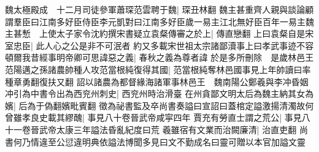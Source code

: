 魏太極殿成　十二月司徒參軍蕭琛范雲聘于魏|{
	琛丑林翻}
魏主甚重齊人親與談論顧謂羣臣曰江南多好臣侍臣李元凱對曰江南多好臣歲一易主江北無好臣百年一易主魏主甚慙　上使太子家令沈約撰宋書疑立袁粲傳審之於上|{
	傳直戀翻}
上曰袁粲自是宋室忠臣|{
	此人心之公是非不可泯者}
約又多載宋世祖太宗諸鄙瀆事上曰孝武事迹不容頓爾我昔經事明帝卿可思諱惡之義|{
	春秋之義為尊者諱}
於是多所刪除　是歲林邑王范陽邁之孫諸農帥種人攻范當根純復得其國|{
	范當根純奪林邑國事見上年帥讀曰率種章勇翻復扶又翻}
詔以諸農為都督緣海諸軍事林邑王　魏南陽公鄭羲與李冲昏姻冲引為中書令出為西兖州刺史|{
	西兖州時治滑臺}
在州貪鄙文明太后為魏主納其女為嬪|{
	后為于偽翻嬪毗賓翻}
徵為祕書監及卒尚書奏謚曰宣詔曰蓋棺定謚激揚清濁故何曾雖孝良史載其繆醜|{
	事見八十卷晉武帝咸寜四年}
賈充有勞直士謂之荒公|{
	事見八十一卷晉武帝太康三年謚法昏亂紀度曰荒}
羲雖宿有文業而治闕廉清|{
	治直吏翻}
尚書何乃情違至公愆違明典依謚法博聞多見曰文不勤成名曰靈可贈以本官加謚文靈

